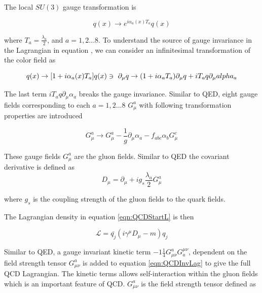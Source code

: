The local $SU(3)$ gauge transformation is 

\begin{equation}
q(x) \rightarrow e^{i \alpha_a(x) T_{a}} q(x)
\label{eqn:QCDSU3LT}
\end{equation}

where $T_{a} = \frac{\lambda_{a}}{2}$, and $a = {1,2...8}$. To understand the source of gauge invariance in the Lagrangian in equation \label{eqn:QCDStartL}, we can consider an infinitesimal transformation of the color field as 

\begin{equation}
q(x) \rightarrow [ 1 + i\alpha_{a}(x)T_{a}]q(x) \\
\ni ~ \partial_{\mu}q \rightarrow ( 1 + i\alpha_{a}T_{a})\partial_{\mu}q + iT_{a}q\partial_{\mu} alpha_{a}
\end{equation}

The last term $iT_{a}q\partial_{\mu} \alpha_{a}$ breaks the gauge invariance. Similar to QED, eight gauge fields corresponding to each $a = {1,2...8}$ $G_{\mu}^{a}$ with following transformation properties are introduced 

\begin{equation}
G_{\mu}^{a} \rightarrow G_{\mu}^{a} - \frac{1}{g} \partial_{\mu} \alpha_{a} - f_{abc}\alpha_{b}G^{c}_{\mu}
\label{eqn:SU3GaugeField}
\end{equation}

These gauge fields $G_{\mu}^{a}$ are the gluon fields. Similar to QED the covariant derivative is defined as
\begin{equation}
D_{\mu} = \partial_{\mu} + ig_{s}\frac{\lambda_{a}}{2}G_{\mu}^{a} 
\label{eqn:SU3CovDerv}
\end{equation}

where $g_{s}$ is the coupling strength of the gluon fields to the quark fields.

The Lagrangian density in equation \ref{eqn:QCDStartL} is then 

\begin{equation}
\mathcal{L} = \bar{q_{j}}(i\gamma^{\mu}D_{\mu} - m )q_{j}
\label{eqn:QCDInvLag}
\end{equation}

Similar to QED, a gauge invariant kinetic term $-1\frac{1}{4}G^{a}_{\mu\nu}G^{\mu\nu}_{a}$, dependent on the field strength tensor $G^{a}_{\mu\nu}$ is added to equation \ref{eqn:QCDInvLag} to give the full QCD Lagrangian. The kinetic terms allows self-interaction within the gluon fields which is an important feature of QCD. $G^{a}_{\mu\nu}$ is the field strength tensor defined as

